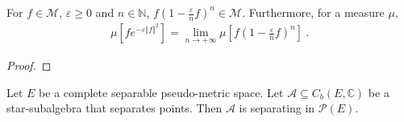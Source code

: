 \begin{lemma}\label{lem:exponiential_M_eq_limit_M}
For $f \in \mathcal M$, $\varepsilon \ge 0$ and $n \in \mathbb{N}$, $f (1 - \frac{\varepsilon}{n} f)^n \in \mathcal M$. Furthermore, for a measure $\mu$,
\begin{align*}
\mu\left[f e^{-\varepsilon \Vert f \Vert^2}\right] = \lim_{n \to + \infty} \mu\left[f (1 - \frac{\varepsilon}{n} f)^n\right] \: .
\end{align*}
\end{lemma}

\begin{proof}
\end{proof}

\begin{theorem}\label{thm:separating_starSubalgebra}
Let $E$ be a complete separable pseudo-metric space. Let $\mathcal A \subseteq C_b(E, \mathbb{C})$ be a star-subalgebra that separates points. Then $\mathcal A$ is separating in $\mathcal P(E)$.
\end{theorem}


